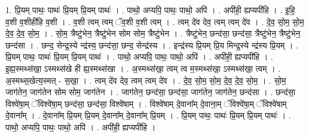 \documentclass[17pt]{extarticle}
\begin{document}
1. प्रि॒यम् पाथः॒ पाथः॑ प्रि॒यम् प्रि॒यम् पाथः॑ । . पाथो॒ अप्यपि॒ पाथः॒ पाथो॒ अपि॑ । . अपी॑ही॒ ह्यप्यपी॑हि । . इ॒हि॒ व॒शी व॒शीही॑हि व॒शी । . व॒शी त्वम् त्वम् ॅव॒शी व॒शी त्वम् । . त्वम् दे॑व देव॒ त्वम् त्वम् दे॑व । . दे॒व॒ सो॒म॒ सो॒म॒ दे॒व॒ दे॒व॒ सो॒म॒ । . सो॒म॒ त्रैष्टु॑भेन॒ त्रैष्टु॑भेन सोम सोम॒ त्रैष्टु॑भेन । . त्रैष्टु॑भेन॒ छन्द॑सा॒ छन्द॑सा॒ त्रैष्टु॑भेन॒ त्रैष्टु॑भेन॒ छन्द॑सा । . छन्द॒ सेन्द्र॒स्ये न्द्र॑स्य॒ छन्द॑सा॒ छन्द॒ सेन्द्र॑स्य । . इन्द्र॑स्य प्रि॒यम् प्रि॒य मिन्द्र॒स्ये न्द्र॑स्य प्रि॒यम् । . प्रि॒यम् पाथः॒ पाथः॑ प्रि॒यम् प्रि॒यम् पाथः॑ । . पाथो॒ अप्यपि॒ पाथः॒ पाथो॒ अपि॑ । . अपी॑ही॒ ह्यप्यपी॑हि । . इ॒ह्य॒स्मथ्स॑खा॒ ऽस्मथ्स॑खे ही ह्य॒स्मथ्स॑खा । . अ॒स्मथ्स॑खा॒ त्वम् त्व म॒स्मथ्स॑खा॒ ऽस्मथ्स॑खा॒ त्वम् । . अ॒स्मथ्स॒खेत्य॒स्मत् - स॒खा॒ । . त्वम् दे॑व देव॒ त्वम् त्वम् दे॑व । . दे॒व॒ सो॒म॒ सो॒म॒ दे॒व॒ दे॒व॒ सो॒म॒ । . सो॒म॒ जाग॑तेन॒ जाग॑तेन सोम सोम॒ जाग॑तेन । . जाग॑तेन॒ छन्द॑सा॒ छन्द॑सा॒ जाग॑तेन॒ जाग॑तेन॒ छन्द॑सा । . छन्द॑सा॒ विश्वे॑षा॒म् ॅविश्वे॑षा॒म् छन्द॑सा॒ छन्द॑सा॒ विश्वे॑षाम् । . विश्वे॑षाम् दे॒वाना᳚म् दे॒वाना॒म् ॅविश्वे॑षा॒म् ॅविश्वे॑षाम् दे॒वाना᳚म् । . दे॒वाना᳚म् प्रि॒यम् प्रि॒यम् दे॒वाना᳚म् दे॒वाना᳚म् प्रि॒यम् । . प्रि॒यम् पाथः॒ पाथः॑ प्रि॒यम् प्रि॒यम् पाथः॑ । . पाथो॒ अप्यपि॒ पाथः॒ पाथो॒ अपि॑ । . अपी॑ही॒ ह्यप्यपी॑हि । \newline
\end{document}

